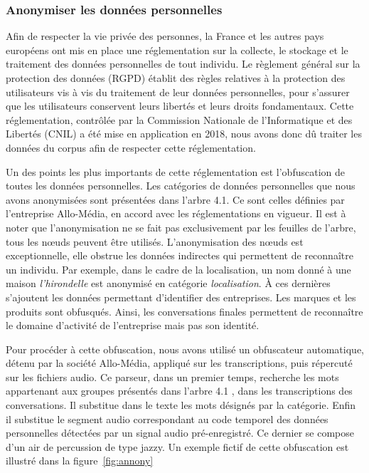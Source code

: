 \subsubsection{Anonymiser les données personnelles}



Afin de respecter la vie privée des personnes, la France et les autres pays européens ont mis en place une réglementation sur la collecte, le stockage et le traitement des données personnelles de tout individu. Le règlement général sur la protection des données (RGPD) établit des règles relatives à la protection des utilisateurs vis à vis du traitement de leur données personnelles, pour s'assurer que les utilisateurs conservent leurs libertés et leurs droits fondamentaux. Cette réglementation, contrôlée par la Commission Nationale de l'Informatique et des Libertés (CNIL) a été mise en application en 2018, nous avons donc dû traiter les données du corpus afin de respecter cette réglementation.

Un des points les plus importants de cette réglementation est l'obfuscation de toutes les données personnelles. Les catégories de données personnelles que nous avons anonymisées sont présentées dans l'arbre 4.1.
Ce sont celles définies par l'entreprise Allo-Média, en accord avec les réglementations en vigueur. Il est à noter que l'anonymisation ne se fait pas exclusivement par les feuilles de l'arbre, tous les nœuds peuvent être utilisés. L'anonymisation des nœuds est exceptionnelle, elle obstrue les données indirectes qui permettent de reconnaître un individu. Par exemple, dans le cadre de la localisation, un nom donné à une maison \textit{l'hirondelle} est anonymisé en catégorie \textit{localisation}. À ces dernières s'ajoutent les données permettant d'identifier des entreprises. Les marques et les produits sont obfusqués. Ainsi, les conversations finales permettent de reconnaître le domaine d'activité de l'entreprise mais pas son identité.



Pour procéder à cette obfuscation, nous avons utilisé un obfuscateur automatique, détenu par la société Allo-Média, appliqué sur les transcriptions, puis répercuté sur les fichiers audio. Ce parseur, dans un premier temps, recherche les mots appartenant aux groupes présentés dans l'arbre 4.1
, dans les transcriptions des conversations. Il substitue dans le texte les mots désignés par la catégorie. Enfin il substitue le segment audio correspondant au code temporel des données personnelles détectées par un signal audio pré-enregistré. Ce dernier se compose d'un air de percussion de type jazzy. Un exemple fictif de cette obfuscation est illustré dans la figure~\ref{fig:annony}

